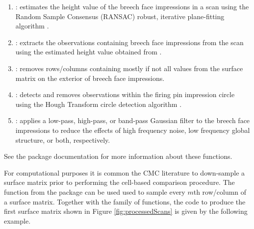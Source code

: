 \begin{enumerate}
\item {}: estimates the height value of the breech face impressions in a scan using the Random Sample Consensus (RANSAC) robust, iterative plane-fitting algorithm \citep{ransac}.

\item {}: extracts the observations containing breech face impressions from the scan using the estimated height value obtained from .

\item {}: removes rows/columns containing mostly if not all  values from the surface matrix on the exterior of breech face impressions.

\item {}: detects and removes observations within the firing pin impression circle using the Hough Transform circle detection algorithm \citep{hough}.

\item {}: applies a low-pass, high-pass, or band-pass Gaussian filter to the breech face impressions to reduce the effects of high frequency noise, low frequency global structure, or both, respectively.
\end{enumerate}

See the  package documentation for more information about
these functions.

For computational purposes it is common the CMC literature to
down-sample a surface matrix prior to performing the cell-based
comparison procedure. The  function from the
 package can be used used to sample every \(m\)th
row/column of a surface matrix. Together with the 
family of functions, the code to produce the first surface matrix shown
in Figure \ref{fig:processedScans} is given by the following example.

